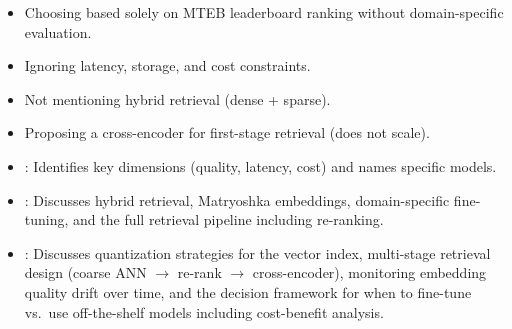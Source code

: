 \begin{interviewq}
\redflags
\begin{itemize}
    \item Choosing based solely on MTEB leaderboard ranking without
    domain-specific evaluation.
    \item Ignoring latency, storage, and cost constraints.
    \item Not mentioning hybrid retrieval (dense + sparse).
    \item Proposing a cross-encoder for first-stage retrieval (does not
    scale).
\end{itemize}


\goodgreat
\begin{itemize}
    \item {}: Identifies key dimensions (quality, latency, cost)
    and names specific models.
    \item {}: Discusses hybrid retrieval, Matryoshka embeddings,
    domain-specific fine-tuning, and the full retrieval pipeline including
    re-ranking.
    \item {}: Discusses quantization strategies for the vector
    index, multi-stage retrieval design (coarse ANN $\to$ re-rank $\to$
    cross-encoder), monitoring embedding quality drift over time, and the
    decision framework for when to fine-tune vs.\ use off-the-shelf models
    including cost-benefit analysis.
\end{itemize}

\end{interviewq}

\vspace{0.5em}

